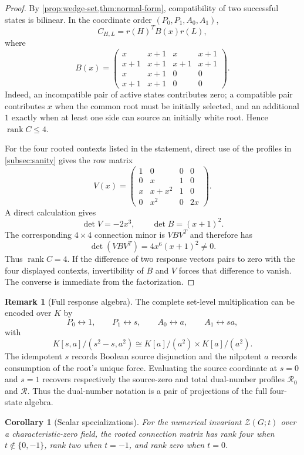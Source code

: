 \documentclass[11pt,reqno]{amsart}
\newtheorem{corollary}[corollary]{Corollary}
\theoremstyle{definition}
\newtheorem{remark}[remark]{Remark}
\newcommand{\Zpoly}{\mathcal Z}
\begin{document}
\begin{proof}
By \cref{prop:wedge-set,thm:normal-form}, compatibility of two successful
states is bilinear.  In the coordinate order $(P_0,P_1,A_0,A_1)$,
\[
  C_{H,L}=r(H)^T B(x)r(L),
\]
where
\[
B(x)=
\begin{pmatrix}
 x&x+1&x&x+1\\
 x+1&x+1&x+1&x+1\\
 x&x+1&0&0\\
 x+1&x+1&0&0
\end{pmatrix}.
\]
Indeed, an incompatible pair of active states contributes zero; a compatible
pair contributes $x$ when the common root must be initially selected, and an
additional $1$ exactly when at least one side can source an initially white
root.  Hence $\operatorname{rank}C\le4$.

For the four rooted contexts listed in the statement, direct use of the
profiles in \cref{subsec:sanity} gives the row matrix
\[
V(x)=
\begin{pmatrix}
 1&0&0&0\\
 0&x&1&0\\
 x&x+x^2&1&0\\
 0&x^2&0&2x
\end{pmatrix}.
\]
A direct calculation gives
\[
  \det V=-2x^3,
  \qquad
  \det B=(x+1)^2.
\]
The corresponding $4\times4$ connection minor is $VBV^T$ and therefore has
\[
  \det(VBV^T)=4x^6(x+1)^2\ne0.
\]
Thus $\operatorname{rank}C=4$.  If the difference of two response vectors
pairs to zero with the four displayed contexts, invertibility of $B$ and $V$
forces that difference to vanish.  The converse is immediate from the
factorization.
\end{proof}

\begin{remark}[Full response algebra]\label{rem:full-algebra}
The complete set-level multiplication can be encoded over $K$ by
\[
  P_0\leftrightarrow1,\qquad P_1\leftrightarrow s,
  \qquad A_0\leftrightarrow a,\qquad A_1\leftrightarrow sa,
\]
with
\[
  K[s,a]/(s^2-s,a^2)
  \cong K[a]/(a^2)\times K[a]/(a^2).
\]
The idempotent $s$ records Boolean source disjunction and the nilpotent $a$
records consumption of the root's unique force.  Evaluating the source
coordinate at $s=0$ and $s=1$ recovers respectively the source-zero and total
dual-number profiles $\mathscr R_0$ and $\mathscr R$.  Thus the dual-number
notation is a pair of projections of the full four-state algebra.
\end{remark}

\begin{corollary}[Scalar specializations]\label{cor:connection-specialization}
For the numerical invariant $\Zpoly(G;t)$ over a characteristic-zero field,
the rooted connection matrix has rank four when $t\notin\{0,-1\}$, rank two
when $t=-1$, and rank zero when $t=0$.
\end{corollary}
\end{document}
